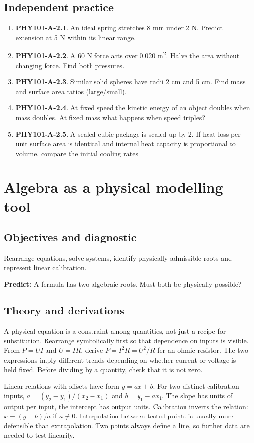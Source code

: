 \documentclass[11pt,a4paper,openany]{book}
\begin{document}
\section{Independent practice}
\begin{enumerate}
\item \textbf{PHY101-A-2.1}. An ideal spring stretches 8 mm under 2 N. Predict extension at 5 N within its linear range.
\item \textbf{PHY101-A-2.2}. A 60 N force acts over 0.020 m\textsuperscript{2}. Halve the area without changing force. Find both pressures.
\item \textbf{PHY101-A-2.3}. Similar solid spheres have radii 2 cm and 5 cm. Find mass and surface area ratios (large/small).
\item \textbf{PHY101-A-2.4}. At fixed speed the kinetic energy of an object doubles when mass doubles. At fixed mass what happens when speed triples?
\item \textbf{PHY101-A-2.5}. A sealed cubic package is scaled up by 2. If heat loss per unit surface area is identical and internal heat capacity is proportional to volume, compare the initial cooling rates.
\end{enumerate}
\chapter{Algebra as a physical modelling tool}
\section{Objectives and diagnostic}
Rearrange equations, solve systems, identify physically admissible roots and represent linear calibration.

\textbf{Predict:} A formula has two algebraic roots. Must both be physically possible?
\section{Theory and derivations}
A physical equation is a constraint among quantities, not just a recipe for substitution. Rearrange symbolically first so that dependence on inputs is visible. From $P=UI$ and $U=IR$, derive $P=I^2R=U^2/R$ for an ohmic resistor. The two expressions imply different trends depending on whether current or voltage is held fixed. Before dividing by a quantity, check that it is not zero.

Linear relations with offsets have form $y=ax+b$. For two distinct calibration inputs, $a=(y_2-y_1)/(x_2-x_1)$ and $b=y_1-ax_1$. The slope has units of output per input, the intercept has output units. Calibration inverts the relation: $x=(y-b)/a$ if $a\ne0$. Interpolation between tested points is usually more defensible than extrapolation. Two points always define a line, so further data are needed to test linearity.
\end{document}
